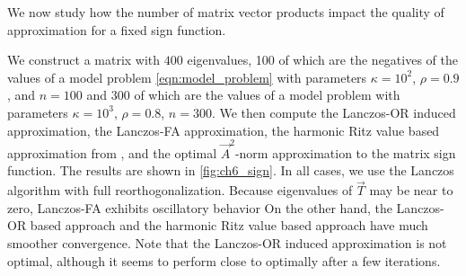 We now study how the number of matrix vector products impact the quality of approximation for a fixed sign function.

We construct a matrix with $400$ eigenvalues, 100 of which are the negatives of the values of a model problem \cref{eqn:model_problem} with parameters $\kappa = 10^2$, $\rho=0.9$, and $n=100$ and 300 of which are the values of a model problem with parameters $\kappa = 10^3$, $\rho=0.8$, $n=300$.
We then compute the Lanczos-OR induced approximation, the Lanczos-FA approximation, the harmonic Ritz value based approximation from \cite{eshof_frommer_lippert_schilling_van_der_vorst_02}, and the optimal $\vec{A}^2$-norm approximation to the matrix sign function.
The results are shown in \cref{fig:ch6_sign}.
In all cases, we use the Lanczos algorithm with full reorthogonalization.
Because eigenvalues of $\vec{T}$ may be near to zero, Lanczos-FA exhibits oscillatory behavior
On the other hand, the Lanczos-OR based approach and the harmonic Ritz value based approach have much smoother convergence.
Note that the Lanczos-OR induced approximation is not optimal, although it seems to perform close to optimally after a few iterations.

